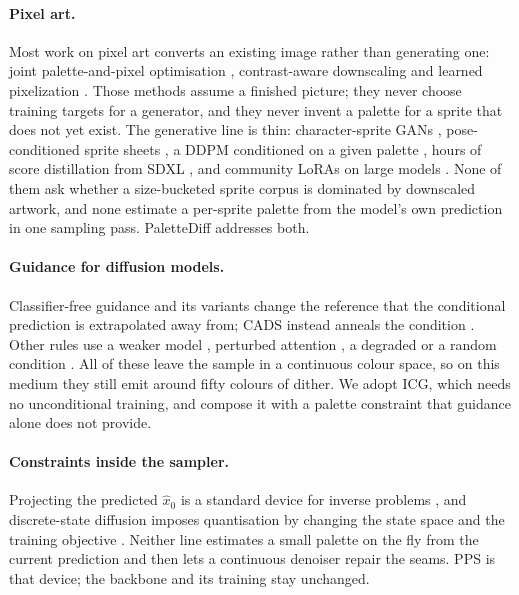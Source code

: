 \documentclass{article} %
\newcommand{\ours}{PaletteDiff}
\begin{document}
\paragraph{Pixel art.}
Most work on pixel art converts an existing image rather than generating one: joint palette-and-pixel optimisation
\citep{Gerstner2012}, contrast-aware downscaling \citep[PixelOE;][]{PixelOE2024} and learned pixelization
\citep{Han2018,Wu2022}. Those methods assume a finished picture; they never choose training targets for a generator,
and they never invent a palette for a sprite that does not yet exist. The generative line is thin: character-sprite
GANs \citep{Coutinho2022}, pose-conditioned sprite sheets \citep{SpriteSheetDiffusion2024}, a DDPM conditioned on a
given palette \citep{PixDiffPIG}, hours of score distillation from SDXL \citep{Binninger2024}, and community LoRAs on
large models \citep{PixelArtXL,PixelArtLoRAFlux}. None of them ask whether a size-bucketed sprite corpus is dominated
by downscaled artwork, and none estimate a per-sprite palette from the model's own prediction in one sampling pass.
\ours{} addresses both.

\paragraph{Guidance for diffusion models.}
Classifier-free guidance \citep{HoSalimans2022} and its variants
\citep{Kynkaanniemi2024,Sadat2024apg,Sadat2025fdg,Chung2024} change the reference that the conditional prediction is
extrapolated away from; CADS instead anneals the condition \citep{Sadat2024cads}. Other rules use a weaker model
\citep{Karras2024}, perturbed attention \citep{Ahn2024,Hong2023,Hong2024}, a degraded \citep{CDG2026} or a random
condition \citep[ICG;][]{Sadat2024icg}. All of these leave the sample in a continuous colour space, so on this medium
they still emit around fifty colours of dither. We adopt ICG, which needs no unconditional training, and compose it
with a palette constraint that guidance alone does not provide.

\paragraph{Constraints inside the sampler.}
Projecting the predicted $\hat x_0$ is a standard device for inverse problems
\citep{Venkatakrishnan2013,Chung2023dps}, and discrete-state diffusion imposes quantisation by changing the state space
and the training objective \citep{Austin2021,Gu2022vqdiffusion}. Neither line estimates a small palette on the fly from
the current prediction and then lets a continuous denoiser repair the seams. PPS is that device; the backbone and its
training stay unchanged.
\end{document}
